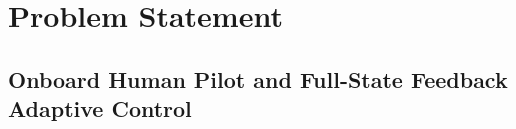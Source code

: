 \chapter{Problem Statement} \label{sec:problem}

\section{Onboard Human Pilot and Full-State Feedback Adaptive Control}


